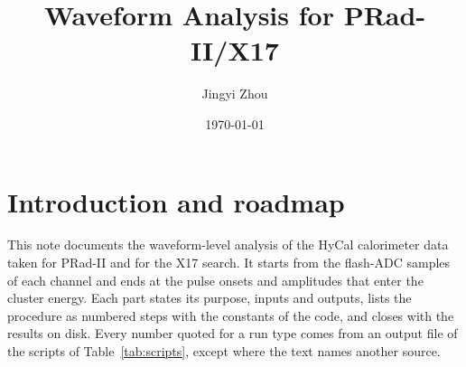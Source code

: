 \documentclass[11pt]{article}
\title{Waveform Analysis for PRad-II/X17}
\author{Jingyi Zhou}
\date{\today}
\begin{document}
\maketitle
\tableofcontents
\clearpage

\section{Introduction and roadmap}
\label{sec:intro}

This note documents the waveform-level analysis of the HyCal calorimeter data taken for PRad-II and for the X17 search. It starts from the flash-ADC samples of each channel and ends at the pulse onsets and amplitudes that enter the cluster energy. Each part states its purpose, inputs and outputs, lists the procedure as numbered steps with the constants of the code, and closes with the results on disk. Every number quoted for a run type comes from an output file of the scripts of Table~\ref{tab:scripts}, except where the text names another source.
\end{document}
